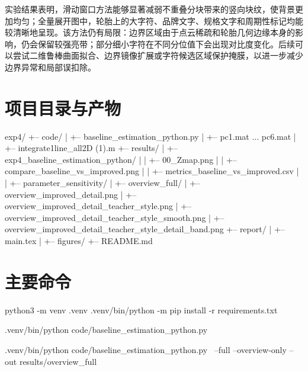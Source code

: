 \documentclass[12pt,hyperref,a4paper,UTF8,fontset=fandol]{ctexart}
\begin{document}
实验结果表明，滑动窗口方法能够显著减弱不重叠分块带来的竖向块纹，使背景更加均匀；全量展开图中，轮胎上的大字符、品牌文字、规格文字和周期性标记均能较清晰地呈现。该方法仍有局限：边界区域由于点云稀疏和轮胎几何边缘本身的影响，仍会保留较强亮带；部分细小字符在不同分位值下会出现对比度变化。后续可以尝试二维鲁棒曲面拟合、边界镜像扩展或字符候选区域保护掩膜，以进一步减少边界异常和局部误扣除。

\appendix
\renewcommand{\thesection}{\Alph{section}}

\section{项目目录与产物}

\begin{python}
exp4/
+-- code/
|   +-- baseline_estimation_python.py
|   +-- pc1.mat ... pc6.mat
|   +-- integrate1line_all2D (1).m
+-- results/
|   +-- exp4_baseline_estimation_python/
|   |   +-- 00_Zmap.png
|   |   +-- compare_baseline_vs_improved.png
|   |   +-- metrics_baseline_vs_improved.csv
|   |   +-- parameter_sensitivity/
|   +-- overview_full/
|       +-- overview_improved_detail.png
|       +-- overview_improved_detail_teacher_style.png
|       +-- overview_improved_detail_teacher_style_smooth.png
|       +-- overview_improved_detail_teacher_style_detail_band.png
+-- report/
|   +-- main.tex
|   +-- figures/
+-- README.md
\end{python}

\section{主要命令}

\begin{python}
python3 -m venv .venv
.venv/bin/python -m pip install -r requirements.txt

.venv/bin/python code/baseline_estimation_python.py

.venv/bin/python code/baseline_estimation_python.py \
    --full --overview-only --out results/overview_full
\end{python}
\end{document}
